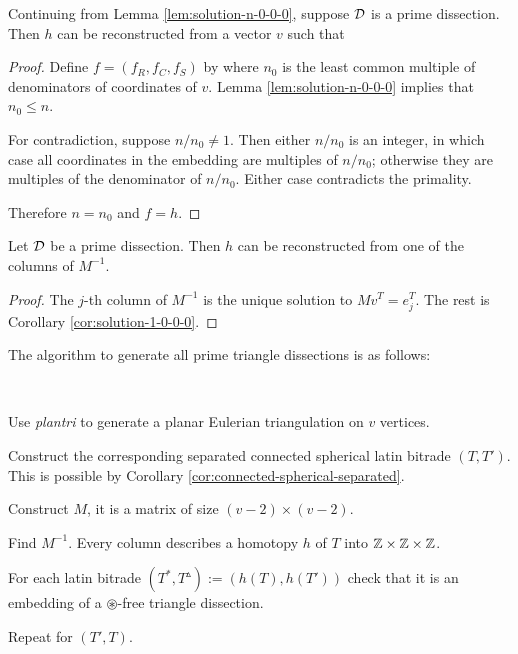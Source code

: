 \begin{cor}
\label{cor:solution-1-0-0-0}
Continuing from Lemma \ref{lem:solution-n-0-0-0}, suppose $\mathcal D$ is a prime dissection. Then $h$ can be reconstructed from a vector $v$ such that
%
\end{cor}
\begin{proof}
Define $f = (f_R, f_C, f_S)$ by
%
where $n_0$ is the least common multiple of denominators of coordinates of $v$. Lemma \ref{lem:solution-n-0-0-0} implies that $n_0 \leq n$.

For contradiction, suppose $n/n_0 \ne 1$. Then either $n/n_0$ is an integer, in which case all coordinates in the embedding are multiples of $n/n_0$; otherwise they are multiples of the denominator of $n/n_0$. Either case contradicts the primality.

Therefore $n = n_0$ and $f=h$.
\end{proof}

\begin{lem}
Let $\mathcal D$ be a prime dissection. Then $h$ can be reconstructed from one of the columns of $M^{-1}$.
\end{lem}%
\begin{proof}
The $j$-th column of $M^{-1}$ is the unique solution to $Mv^T = e_j^T$. The rest is Corollary \ref{cor:solution-1-0-0-0}.
\end{proof}

The algorithm to generate all prime triangle dissections is as follows:

\begin{alg}\ 
\label{alg:tranquility}
\begin{cosyenumerate}
	\item Use \emph{plantri} to generate a planar Eulerian triangulation on $v$ vertices.
	\item Construct the corresponding separated connected spherical latin bitrade $(T,T')$. This is possible by Corollary \ref{cor:connected-spherical-separated}.
	\item Construct $M$, it is a matrix of size $(v-2) \times (v-2)$.
	\item Find $M^{-1}$. Every column describes a homotopy $h$ of $T$ into $\mathbb Z\times\mathbb Z\times\mathbb Z$.
	\item For each latin bitrade $(T^*,T^\vartriangle) := (h(T),h(T'))$ check that it is an embedding of a $\circledast$-free triangle dissection.
	\item Repeat for $(T',T)$.
\end{cosyenumerate}
\end{alg}%

